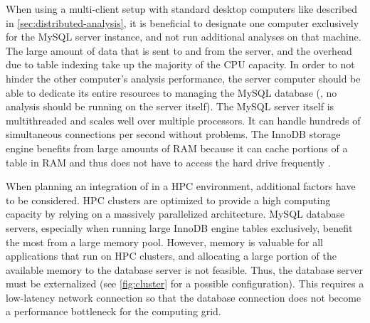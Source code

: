 \label{sec:distributed-analysis-discussion}
When using a multi-client setup with standard desktop computers like described
in \autoref{sec:distributed-analysis}, it is beneficial to designate one
computer exclusively for the MySQL server instance, and not run additional
\pname analyses on that machine. The large amount of data that is sent to and
from the server, and the overhead due to table indexing take up the majority of
the CPU capacity. In order to not hinder the other computer's analysis
performance, the server computer should be able to dedicate its entire resources
to managing the MySQL database (\ie, no \pname analysis should be running on the
server itself). The MySQL server itself is multithreaded and scales well over
multiple processors. It can handle hundreds of simultaneous connections per
second without problems. The InnoDB storage engine benefits from large amounts
of RAM because it can cache portions of a table in RAM and thus does not have to
access the hard drive frequently \citep{schneider2005}.

When planning an integration of \pname in a HPC environment, additional factors
have to be considered. HPC clusters are optimized to provide a high computing
capacity by relying on a massively parallelized architecture. MySQL database
servers, especially when running large InnoDB engine tables exclusively, benefit
the most from a large memory pool. However, memory is valuable for all
applications that run on HPC clusters, and allocating a large portion of the
available memory to the database server is not feasible. Thus, the database
server must be externalized (see \autoref{fig:cluster} for a possible
configuration). This requires a low-latency network connection so that the
database connection does not become a performance bottleneck for the computing
grid.


